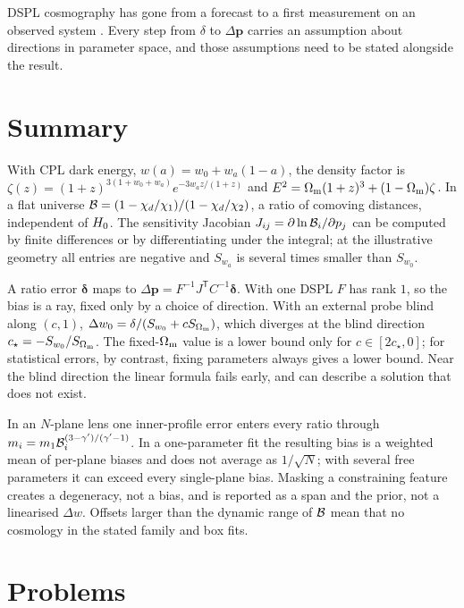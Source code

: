 DSPL cosmography has gone from a forecast \citep{collett_2012} to a first
measurement on an observed system \citep{collett_auger_2014}. Every step
from $\delta$ to $\Delta\bm{p}$ carries an assumption about directions in
parameter space, and those assumptions need to be stated alongside the
result.


\section{Summary}
\label{sec:cs_summary}

With CPL dark energy, $w(a)=w_0+w_a(1-a)$, the density factor is
$\zeta(z)=(1+z)^{3(1+w_0+w_a)}e^{-3w_az/(1+z)}$ and
$E^2=\Omega_{\mathrm{m}}(1+z)^3+(1-\Omega_{\mathrm{m}})\zeta$. In a flat universe
$\mathcal{B}=(1-\chi_d/\chi_1)/(1-\chi_d/\chi_2)$, a ratio of comoving
distances, independent of $H_0$. The sensitivity Jacobian
$J_{ij}=\partial\ln\mathcal{B}_i/\partial p_j$ can be computed by finite
differences or by differentiating under the integral; at the
illustrative geometry all entries are negative and $S_{w_a}$ is several
times smaller than $S_{w_0}$.

A ratio error $\bm{\delta}$ maps to
$\Delta\bm{p}=F^{-1}J^{\mathsf T}C^{-1}\bm{\delta}$. With one DSPL $F$
has rank $1$, so the bias is a ray, fixed only by a choice of direction.
With an external probe blind along $(c,1)$,
$\Delta w_0=\delta/(S_{w_0}+cS_{\Omega_{\mathrm{m}}})$, which diverges at the blind
direction $c_\star=-S_{w_0}/S_{\Omega_{\mathrm{m}}}$. The fixed-$\Omega_{\mathrm{m}}$ value is a
lower bound only for $c\in[2c_\star,0]$; for statistical errors, by
contrast, fixing parameters always gives a lower bound. Near the blind
direction the linear formula fails early, and can describe a solution
that does not exist.

In an $N$-plane lens one inner-profile error enters every ratio through
$m_i=m_1\mathcal{B}_i^{(3-\gamma')/(\gamma'-1)}$. In a one-parameter fit the
resulting bias is a weighted mean of per-plane biases and does not
average as $1/\sqrt{N}$; with several free parameters it can exceed
every single-plane bias. Masking a constraining feature creates a
degeneracy, not a bias, and is reported as a span and the prior, not a
linearised $\Delta w$. Offsets larger than the dynamic range of $\mathcal{B}$
mean that no cosmology in the stated family and box fits.


\section{Problems}
\label{sec:cs_problems}

